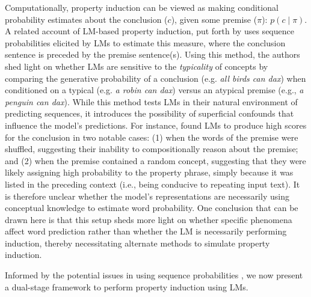 \documentclass[10pt,letterpaper]{article}
\newcommand{\km}[1]{\textcolor{purple}{$_{KM}$[#1]}}
\begin{document}
Computationally, property induction can be viewed as making conditional probability estimates about the conclusion ($c$), given some premise ($\pi$): $p(c\mid\pi)$.
A related account of LM-based property induction, put forth by \citet{misra2021typicality} uses sequence probabilities elicited by LMs to estimate this measure, where the conclusion sentence is preceded by the premise sentence(s). Using this method, the authors shed light on whether LMs are sensitive to the \textit{typicality} of concepts \citep{rosch1975cognitive} by comparing the generative probability of a conclusion (e.g. \textit{all birds can dax}) when conditioned on a typical (e.g. \textit{a robin can dax}) versus an atypical premise (e.g., \textit{a penguin can dax}).
While this method tests LMs in their natural environment of predicting sequences, it introduces the possibility of superficial confounds that influence the model's predictions. For instance, \citet{misra2021typicality} found LMs to produce high scores for the conclusion in two notable cases: (1) when the words of the premise were shuffled, suggesting their inability to compositionally reason about the premise; and (2) when the premise contained a random concept, suggesting that they were likely assigning high probability to the property phrase, simply because it was listed in the preceding context (i.e., being conducive to repeating input text).
It is therefore unclear whether the model's representations are necessarily using conceptual knowledge to estimate word probability.
One conclusion that can be drawn here is that this setup sheds more light on whether specific phenomena affect word prediction rather than whether the LM is necessarily performing induction, thereby necessitating alternate methods to simulate property induction.

Informed by the potential issues in using sequence probabilities \citep{misra2021typicality}, 
we now present a dual-stage framework to perform property induction using LMs.
\end{document}

